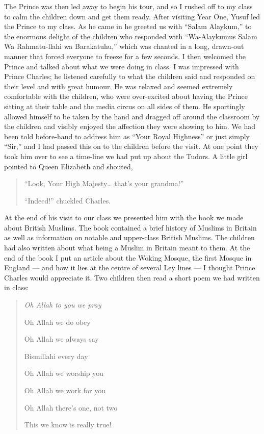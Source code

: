 \documentclass[12pt]{memoir}
\def\–{-\hskip0pt}
\begin{document}
The Prince was then led away to begin his tour,
and so I rushed off to my class to calm the children down and get them ready.
After visiting Year One, Yusuf led the Prince to my class.
As he came in he greeted us with “Salam Alaykum,”
to the enormous delight of the children who responded with
“Wa-Alaykumus Salam Wa Rahmatu-llahi wa Barakatuhu,”
which was chanted in a long, drawn-out manner
that forced everyone to freeze for a few seconds.
I then welcomed the Prince and talked about what we were doing in class.
I was impressed with Prince Charles;
he listened carefully to what the children said
and responded on their level and with great humour.
He was relaxed and seemed extremely comfortable with the children,
who were over\–excited about having the Prince sitting at their table
and the media circus on all sides of them.
He sportingly allowed himself to be taken by the hand
and dragged off around the classroom by the children
and visibly enjoyed the affection they were showing to him.
We had been told before-hand to address him as “Your Royal Highness”
or just simply “Sir,”
and I had passed this on to the children before the visit.
At one point they took him over to see a time-line
we had put up about the Tudors.
A little girl pointed to Queen Elizabeth and shouted,

\begin{quote}
“Look, Your High Majesty… that’s your grandma!”

“Indeed!” chuckled Charles.
\end{quote}

At the end of his visit to our class we presented him
with the book we made about British Muslims.
The book contained a brief history of Muslims in Britain
as well as information on notable and upper-class British Muslims.
The children had also written about
what being a Muslim in Britain meant to them.
At the end of the book I put an article about the Woking Mosque,
the first Mosque in England —
and how it lies at the centre of several Ley lines —
I thought Prince Charles would appreciate it.
Two children then read a short poem we had written in class:

\begin{quote}
\itshape
Oh Allah to you we pray

Oh Allah we do obey

Oh Allah we always say

Bismillahi every day

Oh Allah we worship you

Oh Allah we work for you

Oh Allah there’s one, not two

This we know is really true!
\end{quote}
\end{document}
